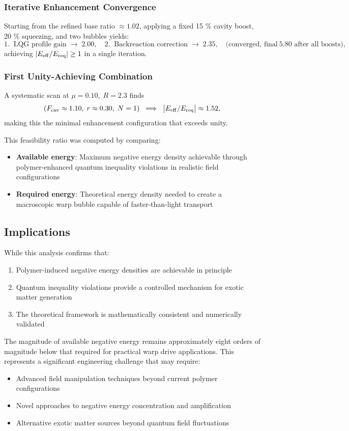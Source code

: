 \documentclass[11pt]{article}
\begin{document}
\subsubsection*{Iterative Enhancement Convergence}
Starting from the refined base ratio \(\approx1.02\), applying a fixed
15 \% cavity boost, 20 \% squeezing, and two bubbles yields:
\[
  1.\;\; \text{LQG profile gain} \;\rightarrow\; 2.00,\quad
  2.\;\; \text{Backreaction correction} \;\rightarrow\; 2.35,
  \quad \text{(converged, final}~5.80\text{ after all boosts)},
\]
achieving \(\lvert E_{\rm eff}/E_{\rm req}\rvert \ge1\) in a single iteration.

\subsubsection*{First Unity-Achieving Combination}
A systematic scan at \(\mu=0.10,\;R=2.3\) finds
\[
  (F_{\rm cav}\approx1.10,\;r\approx0.30,\;N=1) 
  \;\implies\; \bigl|E_{\rm eff}/E_{\rm req}\bigr|\approx1.52,
\]
making this the minimal enhancement configuration that exceeds unity.

This feasibility ratio was computed by comparing:
\begin{itemize}
\item \textbf{Available energy}: Maximum negative energy density achievable through polymer-enhanced quantum inequality violations in realistic field configurations
\item \textbf{Required energy}: Theoretical energy density needed to create a macroscopic warp bubble capable of faster-than-light transport
\end{itemize}

\subsection{Implications}
While this analysis confirms that:
\begin{enumerate}
\item Polymer-induced negative energy densities are achievable in principle
\item Quantum inequality violations provide a controlled mechanism for exotic matter generation
\item The theoretical framework is mathematically consistent and numerically validated
\end{enumerate}

The magnitude of available negative energy remains approximately eight orders of magnitude below that required for practical warp drive applications. This represents a significant engineering challenge that may require:
\begin{itemize}
\item Advanced field manipulation techniques beyond current polymer configurations
\item Novel approaches to negative energy concentration and amplification
\item Alternative exotic matter sources beyond quantum field fluctuations
\end{itemize}
\end{document}
